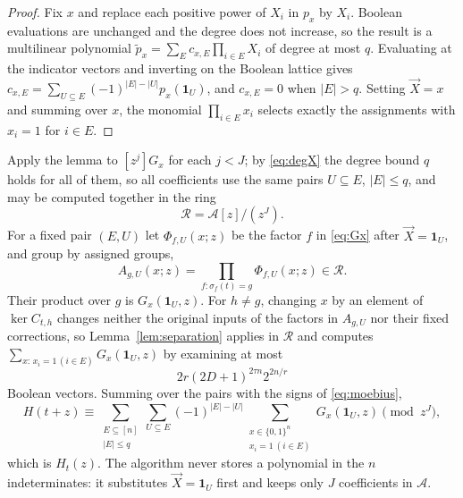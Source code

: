 \documentclass[11pt,reqno]{amsart}
\numberwithin{equation}{section}
\theoremstyle{plain}
\theoremstyle{definition}
\theoremstyle{remark}
\newcommand{\A}{\mathcal{A}}
\begin{document}
\begin{proof}
Fix $x$ and replace each positive power of $X_i$ in $p_x$ by $X_i$. Boolean
evaluations are unchanged and the degree does not increase, so the result is a
multilinear polynomial $\tilde p_x=\sum_{E}c_{x,E}\prod_{i\in E}X_i$ of degree
at most $q$. Evaluating at the indicator vectors and inverting on the Boolean
lattice gives $c_{x,E}=\sum_{U\subseteq E}(-1)^{|E|-|U|}p_x(\mathbf 1_U)$, and
$c_{x,E}=0$ when $|E|>q$. Setting $\vec X=x$ and summing over $x$, the monomial
$\prod_{i\in E}x_i$ selects exactly the assignments with $x_i=1$ for $i\in E$.
\end{proof}

Apply the lemma to $[z^j]G_x$ for each $j<J$; by \eqref{eq:degX} the degree bound
$q$ holds for all of them, so all coefficients use the same pairs $U\subseteq E$,
$|E|\le q$, and may be computed together in the ring
\begin{equation}\label{eq:Rring}
  \mathcal R=\A[z]/(z^{J}).
\end{equation}
For a fixed pair $(E,U)$ let $\Phi_{f,U}(x;z)$ be the factor $f$ in
\eqref{eq:Gx} after $\vec X=\mathbf 1_U$, and group by assigned groups,
\begin{equation}\label{eq:AgU}
  A_{g,U}(x;z)=\prod_{f:\sigma_f(t)=g}\Phi_{f,U}(x;z)\in\mathcal R .
\end{equation}
Their product over $g$ is $G_x(\mathbf 1_U,z)$. For $h\ne g$, changing $x$ by an
element of $\ker C_{t,h}$ changes neither the original inputs of the factors in
$A_{g,U}$ nor their fixed corrections, so Lemma~\ref{lem:separation} applies in
$\mathcal R$ and computes $\sum_{x:\,x_i=1\,(i\in E)}G_x(\mathbf 1_U,z)$ by
examining at most
\begin{equation}\label{eq:pervectors}
  2r(2D+1)^{2\tau n}2^{2n/r}
\end{equation}
Boolean vectors. Summing over the pairs with the signs of \eqref{eq:moebius},
\begin{equation}\label{eq:Htsum}
  H(t+z)\equiv\sum_{\substack{E\subseteq[n]\\|E|\le q}}\sum_{U\subseteq E}(-1)^{|E|-|U|}
  \sum_{\substack{x\in\{0,1\}^n\\ x_i=1\ (i\in E)}}G_x(\mathbf 1_U,z)\pmod{z^{J}},
\end{equation}
which is $H_t(z)$. The algorithm never stores a polynomial in the $n$
indeterminates: it substitutes $\vec X=\mathbf 1_U$ first and keeps only $J$
coefficients in $\A$.
\end{document}

